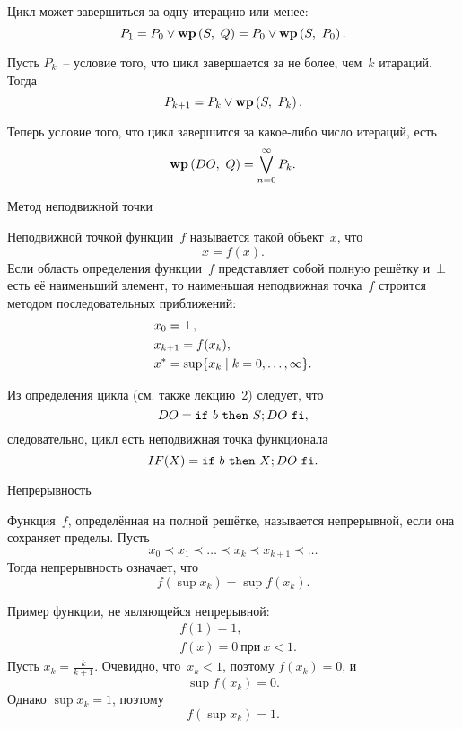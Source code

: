 \documentclass[landscape]{slides}
\begin{document}
\begin{slide}
        Цикл может завершиться за одну итерацию или менее:
        \[
                P_1 = P_0 \lor \mathbf{wp}\left({S},\ {Q}\right) = P_0 \lor \mathbf{wp}\left({S},\ {P_0}\right) .
        \]

        Пусть $P_k$~-- условие того, что цикл завершается за не более, чем~$k$ итараций.
        Тогда
        \[
                P_{k+1} = P_k \lor \mathbf{wp}\left({S},\ {P_k}\right) .
        \]

        Теперь условие того, что цикл завершится за какое-либо число итераций, есть
        \[
                \mathbf{wp}\left({DO},\ {Q}\right) = \bigvee_{n=0}^{\infty} P_k .
        \]
\end{slide}

\begin{slide}
        Метод неподвижной точки

        Неподвижной точкой функции~$f$ называется такой объект~$x$, что
        \[
                x = f(x) .
        \]
        Если область определения функции~$f$ представляет собой полную решётку и~$\bot$ есть её
        наименьший элемент, то наименьшая неподвижная точка~$f$ строится методом последовательных
        приближений:
        \begin{eqnarray*}
                &x_0 = \bot,\\
                &x_{k+1} = f(x_k),\\
                &x^* = \mathrm{sup} \{ x_k \mid k=0,\ldots,\infty\} .
        \end{eqnarray*}

        Из определения цикла (см. также лекцию~2) следует, что
        \[
                DO = \mathtt{if}\ {b}\ \mathtt{then}\ {S; DO}\ \mathtt{fi} ,
        \]
        следовательно, цикл есть неподвижная точка функционала
        \[
                IF(X) = \mathtt{if}\ {b}\ \mathtt{then}\ {X; DO}\ \mathtt{fi} .
        \]
\end{slide}

\begin{slide}
        Непрерывность

        Функция~$f$, определённая на полной решётке, называется непрерывной, если она сохраняет пределы.
        Пусть
        \[
                x_0\prec x_1\prec\ldots\prec x_k\prec x_{k+1}\prec\ldots
        \]
        Тогда непрерывность означает, что
        \[
                f\left(\sup{x_k}\right) = \sup f\left(x_k\right) .
        \]

        Пример функции, не являющейся непрерывной:
        \begin{eqnarray*}
                &f(1) = 1 ,\\
                &f(x) = 0\ \text{при}\ x<1.
        \end{eqnarray*}
        Пусть $x_k = \frac{k}{k+1}$. Очевидно, что~$x_k < 1$, поэтому $f(x_k) = 0$, и
        \[
                \sup f(x_k) = 0 .
        \]
        Однако $\sup x_k = 1$, поэтому
        \[
                f(\sup x_k) = 1 .
        \]
\end{slide}
\end{document}
